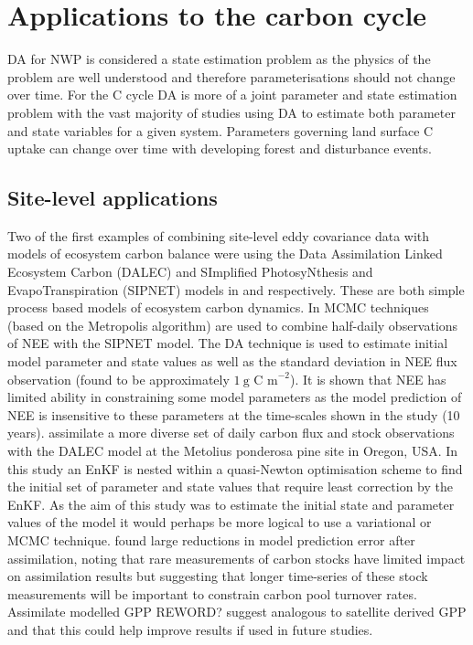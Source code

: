 \documentclass[12pt]{article}
\begin{document}
\section{Applications to the carbon cycle}

DA for NWP is considered a state estimation problem as the physics of the problem are well understood and therefore parameterisations should not change over time. For the C cycle DA is more of a joint parameter and state estimation problem with the vast majority of studies using DA to estimate both parameter and state variables for a given system. Parameters governing land surface C uptake can change over time with developing forest and disturbance events.  

\subsection{Site-level applications}



Two of the first examples of combining site-level eddy covariance data with models of ecosystem carbon balance were using the Data Assimilation Linked Ecosystem Carbon (DALEC) and SImplified PhotosyNthesis and EvapoTranspiration (SIPNET) models in \citet{williams2005improved} and \citet{braswell2005estimating} respectively. These are both simple process based models of ecosystem carbon dynamics. In \citet{braswell2005estimating} MCMC techniques (based on the Metropolis algorithm) are used to combine half-daily observations of NEE with the SIPNET model. The DA technique is used to estimate initial model parameter and state values as well as the standard deviation in NEE flux observation (found to be approximately \(1~\text{g C m}^{-2}\)). It is shown that NEE has limited ability in constraining some model parameters as the model prediction of NEE is insensitive to these parameters at the time-scales shown in the study (10 years). \citet{williams2005improved} assimilate a more diverse set of daily carbon flux and stock observations with the DALEC model at the Metolius ponderosa pine site in Oregon, USA. In this study an EnKF is nested within a quasi-Newton optimisation scheme to find the initial set of parameter and state values that require least correction by the EnKF. As the aim of this study was to estimate the initial state and parameter values of the model it would perhaps be more logical to use a variational or MCMC technique. \citet{williams2005improved} found large reductions in model prediction error after assimilation, noting that rare measurements of carbon stocks have limited impact on assimilation results but suggesting that longer time-series of these stock measurements will be important to constrain carbon pool turnover rates. Assimilate modelled GPP {\color{red}REWORD?} suggest analogous to satellite derived GPP and that this could help improve results if used in future studies.   
\end{document}
